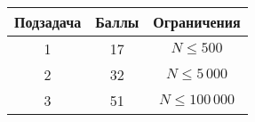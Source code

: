 \begin{tabular}{|c|c|c|}
\hline
\bf{Подзадача}&\bf{Баллы}&\bf{Ограничения}\\\hline
1&17& $N \le 500$\\\hline
2&32& $N \le 5\,000$\\\hline
3&51& $N \le 100\,000$\\\hline
\end{tabular}